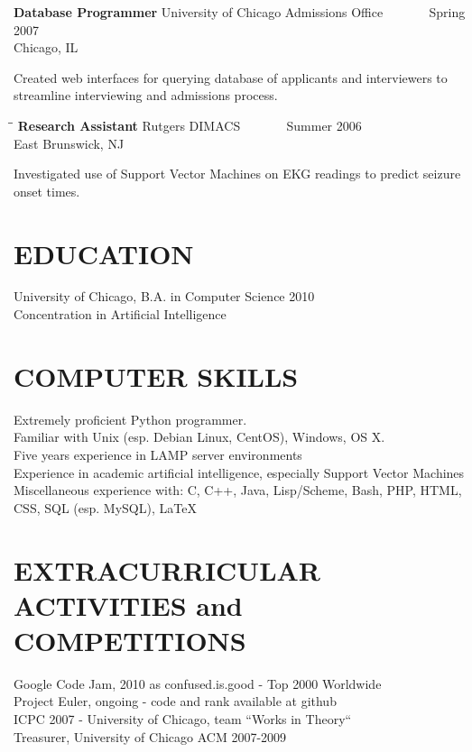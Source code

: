 \documentclass{res}
\begin{document}
\begin{resume}
\begin{tabbing}
    {\bf Database Programmer } \>University of Chicago Admissions Office \> ~~~~~~ Spring 2007\\
                             \>Chicago, IL
   \end{tabbing}\vspace{-20pt}      %
   Created web interfaces for querying database of applicants and interviewers to streamline interviewing and admissions process.
   \begin{tabbing}%
   \hspace{2.3in}\= \hspace{2.6in}\= \kill %
   {\bf Research Assistant}  \>Rutgers DIMACS \> ~~~~~~ Summer 2006\\
                          \>East Brunswick, NJ
   \end{tabbing}\vspace{-20pt}
   Investigated use of Support Vector Machines on EKG readings to predict seizure onset times.


\section{EDUCATION}          
    University of Chicago, B.A. in Computer Science 2010  \\   
    Concentration in Artificial Intelligence      
 
\section{COMPUTER SKILLS}          
    Extremely proficient Python programmer. \\
    Familiar with Unix (esp. Debian Linux, CentOS), Windows, OS X.\\
    Five years experience in LAMP server environments\\
    Experience in academic artificial intelligence, especially Support Vector Machines \\
    Miscellaneous experience with: C, C++, Java, Lisp/Scheme, Bash, PHP, HTML, CSS, SQL (esp. MySQL), \LaTeX \\
 
\section{EXTRACURRICULAR ACTIVITIES and COMPETITIONS}
    Google Code Jam, 2010 as confused.is.good - Top 2000 Worldwide \\
    Project Euler, ongoing - code and rank available at github \\
    ICPC 2007 - University of Chicago, team ``Works in Theory`` \\
    Treasurer, University of Chicago ACM 2007-2009
 
\end{resume}
\end{document}
